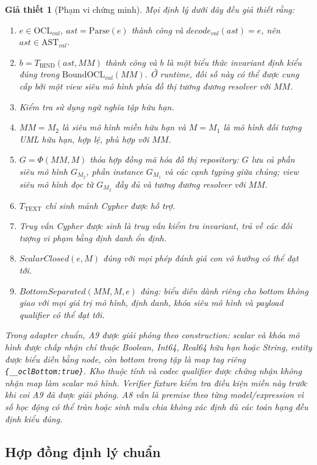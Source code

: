 \documentclass[11pt,a4paper]{article}
\newtheorem{assumption}{Giả thiết}
\theoremstyle{definition}
\newcommand{\OCLval}{\mathrm{OCL}_{val}}
\newcommand{\ASTval}{\mathrm{AST}_{val}}
\newcommand{\BoundOCLval}{\mathrm{BoundOCL}_{val}}
\newcommand{\PhiEnc}{\Phi}
\begin{document}
\begin{assumption}[Phạm vi chứng minh]
Mọi định lý dưới đây đều giả thiết rằng:
\begin{enumerate}[label=(A\arabic*)]
  \item $e\in\OCLval$, $ast=\mathrm{Parse}(e)$ thành công và
  $decode_{val}(ast)=e$, nên $ast\in\ASTval$.
  \item $b=T_{\mathrm{BIND}}(ast,MM)$ thành công và $b$ là một biểu thức
  invariant định kiểu đúng trong $\BoundOCLval(MM)$. Ở runtime, đối số này có
  thể được cung cấp bởi một view siêu mô hình phía đồ thị tương đương resolver
  với $MM$.
  \item Kiểm tra sử dụng ngữ nghĩa tập hữu hạn.
  \item $MM=M_2$ là siêu mô hình miền hữu hạn và $M=M_1$ là mô hình đối tượng
  UML hữu hạn, hợp lệ, phù hợp với $MM$.
  \item $G=\PhiEnc(MM,M)$ thỏa hợp đồng mã hóa đồ thị repository: $G$ lưu cả
  phần siêu mô hình $G_{M_2}$, phần instance $G_{M_1}$ và các cạnh typing giữa
  chúng; view siêu mô hình đọc từ $G_{M_2}$ đầy đủ và tương đương resolver với
  $MM$.
  \item $T_{\mathrm{TEXT}}$ chỉ sinh mảnh Cypher được hỗ trợ.
  \item Truy vấn Cypher được sinh là truy vấn kiểm tra invariant, trả về các đối
  tượng vi phạm bằng định danh ổn định.
  \item $ScalarClosed(e,M)$ đúng với mọi phép đánh giá con vô hướng có thể đạt tới.
  \item $BottomSeparated(MM,M,e)$ đúng: biểu diễn dành riêng cho bottom không
  giao với mọi giá trị mô hình, định danh, khóa siêu mô hình và payload
  qualifier có thể đạt tới.
\end{enumerate}

Trong adapter chuẩn, A9 được giải phóng theo construction: scalar và khóa mô
hình được chấp nhận chỉ thuộc Boolean, Int64, Real64 hữu hạn hoặc String, entity
được biểu diễn bằng node, còn bottom trong tập là map tag riêng
\texttt{\{\_\_oclBottom:true\}}. Kho thuộc tính và codec qualifier được chứng
nhận không nhận map làm scalar mô hình. Verifier fixture kiểm tra điều kiện miền
này trước khi coi A9 đã được giải phóng. A8 vẫn là premise theo từng
model/expression vì số học động có thể tràn hoặc sinh mẫu chia không xác định dù
các toán hạng đều định kiểu đúng.
\end{assumption}

\subsection*{Hợp đồng định lý chuẩn}
\end{document}
